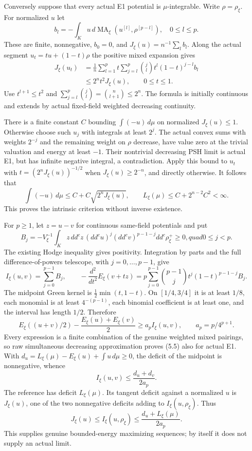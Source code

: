 \documentclass[
  10pt,
]{article}
\begin{document}
Conversely suppose that every actual E1 potential is \(\mu\)-integrable.
Write \(\rho=\rho_\xi\). For normalized \(u\) let \[
 b_l=-\int_Ku\,d\operatorname{MA}_\xi(u^{[l]},\rho^{[p-l]}),
 \quad 0\leq l\leq p.
\] These are finite, nonnegative, \(b_0=0\), and
\(J_\xi(u)=n^{-1}\sum_l b_l\). Along the actual segment
\(u_t=tu+(1-t)\rho\) the positive mixed expansion gives \[
 \begin{split}
 J_\xi(u_t)
 &=\frac1n\sum_{l=1}^p t\sum_{j=l}^p
                    \binom{j}{l}t^l(1-t)^{j-l}b_l\\
 &\leq 2^nt^2J_\xi(u),\qquad 0\leq t\leq1.
 \end{split}                                                   \tag{5.3}
\] Use \(t^{l+1}\leq t^2\) and
\(\sum_{j=l}^p\binom{j}{l}=\binom{n}{l+1}\leq2^n\). The formula is
initially continuous and extends by actual fixed-field weighted
decreasing continuity.

There is a finite constant \(C\) bounding \(\int(-u)\,d\mu\) on
normalized \(J_\xi(u)\leq1\). Otherwise choose such \(u_j\) with
integrals at least \(2^j\). The actual convex sums with weights
\(2^{-j}\) and the remaining weight on \(\rho\) decrease, have value
zero at the trivial valuation and energy at least \(-1\). Their
nontrivial decreasing PSH limit is actual E1, but has infinite negative
integral, a contradiction. Apply this bound to \(u_t\) with
\(t=(2^nJ_\xi(u))^{-1/2}\) when \(J_\xi(u)\geq2^{-n}\), and directly
otherwise. It follows that \[
 \int(-u)\,d\mu\leq C+C\sqrt{2^nJ_\xi(u)},\qquad
 L_\xi(\mu)\leq C+2^{n-2}C^2<\infty.                          \tag{5.4}
\] This proves the intrinsic criterion without inverse existence.

For \(p\geq1\), let \(z=u-v\) for continuous same-field potentials and
put \[
 B_j=-V_\xi^{-1}\int_K z\,dd^cz\,(dd^cu)^j(dd^cv)^{p-1-j}
                         dd^c\rho_\xi^+\geq0,quad 0\leq j<p.
\] The existing Hodge inequality gives positivity. Integration by parts
and the full difference-of-powers telescope, with \(j=0,\ldots,p-1\),
give \[
 I_\xi(u,v)=\sum_{j=0}^{p-1}B_j,\qquad
 -\frac{d^2}{dt^2}E_\xi(v+tz)
   =p\sum_{j=0}^{p-1}\binom{p-1}{j}t^j(1-t)^{p-1-j}B_j.
\] The midpoint Green kernel is \(\tfrac12\min(t,1-t)\). On
\([1/4,3/4]\) it is at least \(1/8\), each monomial is at least
\(4^{-(p-1)}\), each binomial coefficient is at least one, and the
interval has length \(1/2\). Therefore \[
 E_\xi((u+v)/2)-\frac{E_\xi(u)+E_\xi(v)}2
               \geq a_pI_\xi(u,v),\qquad a_p=p/4^{p+1}.          \tag{5.5}
\] Every expression is a finite combination of the genuine weighted
mixed pairings, so raw simultaneous decreasing approximation proves
(5.5) also for actual E1. With
\(d_u=L_\xi(\mu)-E_\xi(u)+\int u\,d\mu\geq0\), the deficit of the
midpoint is nonnegative, whence \[
 I_\xi(u,v)\leq\frac{d_u+d_v}{2a_p}.                            \tag{5.6}
\] The reference has deficit \(L_\xi(\mu)\). Its tangent deficit against
a normalized \(u\) is \(J_\xi(u)\), one of the two nonnegative deficits
adding to \(I_\xi(u,\rho_\xi)\). Thus \[
 J_\xi(u)\leq I_\xi(u,\rho_\xi)
                \leq\frac{d_u+L_\xi(\mu)}{2a_p}.               \tag{5.7}
\] This supplies genuine bounded-energy maximizing sequences; by itself
it does not supply an actual limit.
\end{document}
